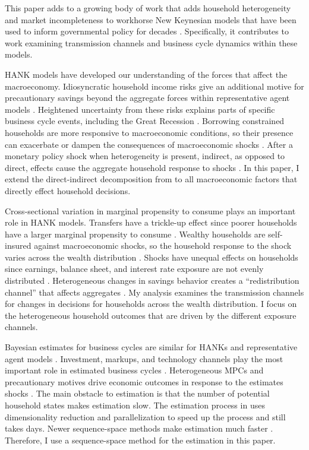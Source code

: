 This paper adds to a growing body of work that adds household heterogeneity and market incompleteness to workhorse New Keynesian models that have been used to inform governmental policy for decades \autocites{woodford2005interest}{smets2007shocks}. Specifically, it contributes to work examining transmission channels and business cycle dynamics within these models. 

HANK models have developed our understanding of the forces that affect the macroeconomy. Idiosyncratic household income risks give an additional motive for precautionary savings beyond the aggregate forces within representative agent models \autocites{mckay2016power}{auclert2020micro}{acharya2023optimal}. Heightened uncertainty from these risks explains parts of specific business cycle events, including the Great Recession \autocites{bayer2019precautionary}. Borrowing constrained households are more responsive to macroeconomic conditions, so their presence can exacerbate or dampen the consequences of macroeconomic shocks \autocites{bilbiie2020new}. After a monetary policy shock when heterogeneity is present, indirect, as opposed to direct, effects cause the aggregate household response to shocks \autocites{kaplan2018monetary}. In this paper, I extend the direct-indirect decomposition from \textcite{kaplan2018monetary} to all macroeconomic factors that directly effect household decisions. 

Cross-sectional variation in marginal propensity to consume plays an important role in HANK models. Transfers have a trickle-up effect since poorer households have a larger marginal propensity to consume \autocite{auclert2023trickling}. Wealthy households are self-insured against macroeconomic shocks, so the household response to the shock varies across the wealth distribution \autocite{gornemann2016doves}. Shocks have unequal effects on households since earnings, balance sheet, and interest rate exposure are not evenly distributed \autocite{auclert2019monetary}. Heterogeneous changes in savings behavior creates a ``redistribution channel'' that affects aggregates \autocite{auclert2019monetary}. My analysis examines the transmission channels for changes in decisions for households across the wealth distribution. I focus on the heterogeneous household outcomes that are driven by the different exposure channels.

Bayesian estimates for business cycles are similar for HANKs and representative agent models \autocites{smets2007shocks}{bayer2024shocks}. Investment, markups, and technology channels play the most important role in estimated business cycles \autocites{auclert2020micro}{bayer2024shocks}. Heterogeneous MPCs and precautionary motives drive economic outcomes in response to the estimates shocks \autocite{auclert2020micro}. The main obstacle to estimation is that the number of potential household states makes estimation slow. The estimation process in \textcite{bayer2024shocks} uses dimensionality reduction and parallelization to speed up the process and still takes days. Newer sequence-space methods make estimation much faster \autocite{auclert2021using}. Therefore, I use a sequence-space method for the estimation in this paper. 

